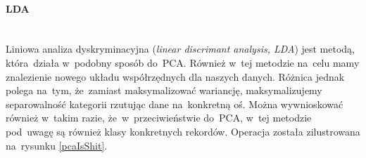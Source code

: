 \paragraph{LDA}\mbox{}\\
Liniowa analiza dyskryminacyjna (\textit{linear discrimant analysis, LDA})\cite{ldaBriefTutorial} jest metodą, która~działa w~podobny sposób do~PCA. Również w~tej metodzie na~celu mamy znalezienie nowego układu współrzędnych dla naszych danych. Różnica jednak polega na~tym, że~zamiast maksymalizować wariancję, maksymalizujemy separowalność kategorii rzutując dane na~konkretną oś. Można wywnioskować również w~takim razie, że~w~przeciwieństwie do~PCA, w~tej metodzie pod~uwagę są również klasy konkretnych rekordów. Operacja została zilustrowana na~rysunku \ref{pcaIsShit}. 


